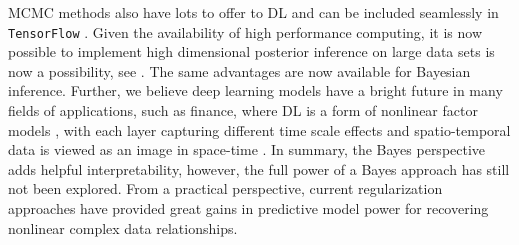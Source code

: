 \documentclass[12pt]{article}
\begin{document}
MCMC methods also have lots to offer to DL and can be included seamlessly in \verb|TensorFlow| \citep{tensorflow2015-whitepaper}. Given the availability  of high performance computing, it is now possible to implement high dimensional posterior inference on large data sets is now a possibility, see \cite{dean_large_2012}. The same advantages are now available for Bayesian inference.  Further, we believe deep learning models have a bright future in many fields of applications, such as finance, where DL is a form of nonlinear factor models \citep{heaton2016deep,heaton2016deepa}, with each layer capturing different time scale effects and spatio-temporal data is viewed as an image in space-time \citep{dixon2017,polson_deep_2017}. In summary, the Bayes perspective adds helpful interpretability, however, the full power of a Bayes approach has still not been explored. From a practical perspective, current regularization approaches have provided great gains in predictive model power for recovering nonlinear complex data relationships. 


\ifarxiv
	
\else
	
\fi
\vspace{0.3in}
\end{document}
